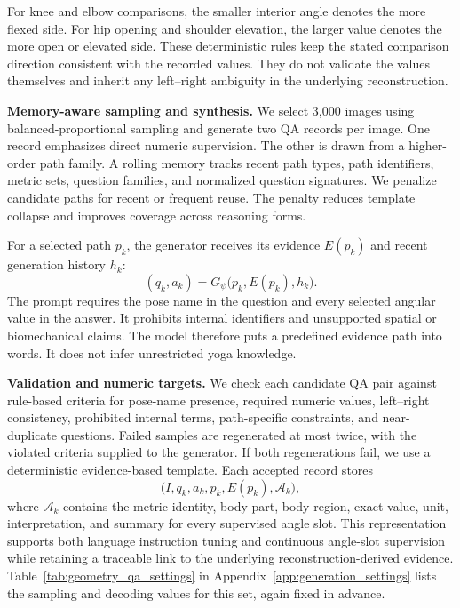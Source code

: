 \documentclass[conference]{IEEEtran}
\begin{document}
For knee and elbow comparisons, the smaller interior angle denotes the more flexed side.
For hip opening and shoulder elevation, the larger value denotes the more open or elevated side.
These deterministic rules keep the stated comparison direction consistent with the recorded values.
They do not validate the values themselves and inherit any left--right ambiguity in the underlying reconstruction.

\noindent\textbf{Memory-aware sampling and synthesis.}
We select 3,000 images using balanced-proportional sampling and generate two QA records per image.
One record emphasizes direct numeric supervision.
The other is drawn from a higher-order path family.
A rolling memory tracks recent path types, path identifiers, metric sets, question families, and normalized question signatures.
We penalize candidate paths for recent or frequent reuse.
The penalty reduces template collapse and improves coverage across reasoning forms.

For a selected path $p_k$, the generator receives its evidence $E(p_k)$ and recent generation history $h_k$:
\begin{equation}
(q_k,a_k)=G_{\psi}\bigl(p_k,E(p_k),h_k\bigr).
\label{eq:geometry_qa}
\end{equation}
The prompt requires the pose name in the question and every selected angular value in the answer.
It prohibits internal identifiers and unsupported spatial or biomechanical claims.
The model therefore puts a predefined evidence path into words.
It does not infer unrestricted yoga knowledge.

\noindent\textbf{Validation and numeric targets.}
We check each candidate QA pair against rule-based criteria for pose-name presence, required numeric values, left--right consistency, prohibited internal terms, path-specific constraints, and near-duplicate questions.
Failed samples are regenerated at most twice, with the violated criteria supplied to the generator.
If both regenerations fail, we use a deterministic evidence-based template.
Each accepted record stores
\begin{equation}
\bigl(I,q_k,a_k,p_k,E(p_k),\mathcal{A}_k\bigr),
\label{eq:geometry_record}
\end{equation}
where $\mathcal{A}_k$ contains the metric identity, body part, body region, exact value, unit, interpretation, and summary for every supervised angle slot.
This representation supports both language instruction tuning and continuous angle-slot supervision while retaining a traceable link to the underlying reconstruction-derived evidence.
Table~\ref{tab:geometry_qa_settings} in Appendix~\ref{app:generation_settings} lists the sampling and decoding values for this set, again fixed in advance.
\end{document}
